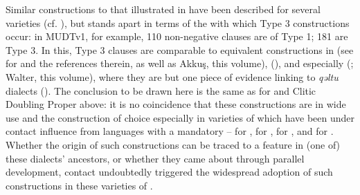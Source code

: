 \documentclass[output=paper]{langsci/langscibook}
\begin{document}
Similar  constructions to that illustrated in  have been described for several  varieties (cf. \citealt[355]{Vanhove1993}), but  stands apart in terms of the  with which Type 3 constructions occur: in MUDTv1, for example, 110 non-negative  clauses are of Type 1; 181 are Type 3. In this,  Type 3  clauses are comparable to equivalent  constructions in   (see \citealt[172--173]{Lahdo2009} for   and the references therein, as well as Akkuş, this volume),   (\citealt[105]{Andalusi2013}), and especially   (\citealt[135]{Borg1985}; Walter, this volume), where they are but one piece of evidence linking   to \textit{qəltu} dialects (\citealt[31]{Borg2004}). The conclusion to be drawn here is the same as for  and Clitic Doubling Proper above: it is no coincidence that these  constructions are in wide use and the  construction of choice especially in varieties of  which have been under contact influence from languages with a mandatory  --  for  ,  for  ,  for  , and  for . Whether the origin of such constructions can be traced to a feature in (one of) these dialects'   ancestors, or whether they came about through parallel development, contact undoubtedly triggered the widespread adoption of such constructions in these varieties of .
\end{document}
